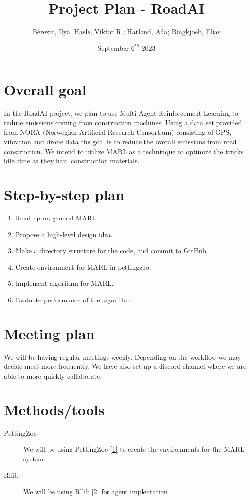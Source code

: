 \documentclass{article}
\title{Project Plan - RoadAI}
\author{Berezin, Ilya; Hasle, Viktor R.; Hatland, Ada; Ringkjoeb, Elias}
\date{September $6^{th}$ 2023}
\begin{document}
\begin{titlepage}
\maketitle
\tableofcontents
\end{titlepage}


\section{Overall goal}
In the RoadAI project, we plan to use Multi Agent Reinforcement Learning to reduce emissions coming from
construction machines. Using a data set provided from NORA (Norwegian Artificial Research Consortium) consisting of GPS, vibration and drone data
the goal is to reduce the overall emissions from road construction. We intend to utilize MARL as a techninque to optimize
the trucks idle time as they haul construction materials.

\section{Step-by-step plan}
\begin{enumerate}
  \item Read up on general MARL.\\
  \item Propose a high-level design idea.\\
  \item Make a directory structure for the code, and commit to GitHub.\\
  \item Create environment for MARL in pettingzoo.\\
  \item Implement algorithm for MARL. \\
  \item Evaluate performance of the algorithm.
\end{enumerate}


\section{Meeting plan}
We will be having regular meetings weekly. Depending on the workflow we may decide meet more frequently.
We have also set up a discord channel where we are able to more quickly collaborate.
\section{Methods/tools}
\begin{description}
  \item[PettingZoo] We will be using PettingZoo \href{https://pettingzoo.farama.org}{[1]} to create the environments for the MARL system.
  \item[Rllib] We will be using Rllib \href{https://docs.ray.io/en/latest/rllib/index.html}{[2]} for agent implentation
\end{description}
\end{document}

